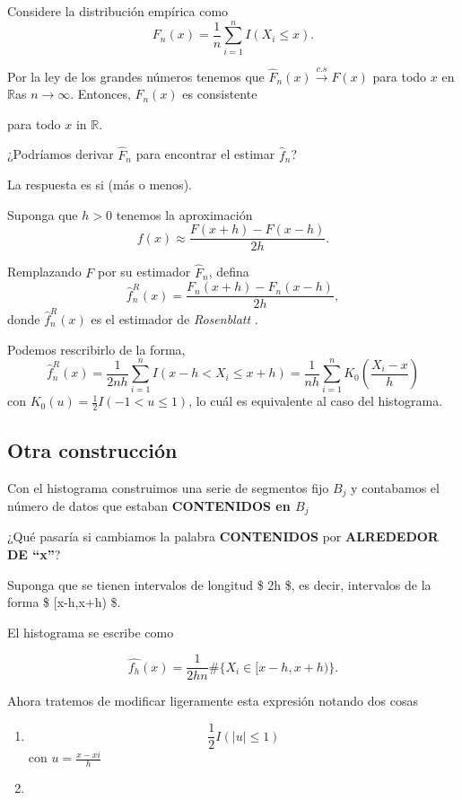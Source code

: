 \documentclass[
  12pt,
]{book}
\theoremstyle{definition}
\theoremstyle{definition}
\theoremstyle{definition}
\theoremstyle{remark}
\let\BeginKnitrBlock\begin \let\EndKnitrBlock\end
\begin{document}
Considere la distribución empírica como
\[
F_{n}(x)=\frac{1}{n}\sum_{i=1}^{n}I(X_{i}\leq x).
\]

Por la ley de los grandes números tenemos que \(\hat{F}_{n}(x) \xrightarrow{c.s} F(x)\) para todo \(x\) en \(\mathbb{R}\)as
\(n\rightarrow\infty\). Entonces, \(F_{n}(x)\) es consistente

para todo \(x\) in \(\mathbb{R}\).

\BeginKnitrBlock{remark}
{}¿Podríamos derivar \(\hat{F}_n\) para encontrar el estimar \(\hat{f}_n\)?
\EndKnitrBlock{remark}

La respuesta es si (más o menos).

Suponga que \(h>0\) tenemos la aproximación
\[
f(x)\approx\frac{F(x+h)-F(x-h)}{2h}.
\]

Remplazando \(F\) por su estimador \(\hat{F}_{n}\), defina
\[
\hat{f}_{n}^{R}(x)=\frac{F_{n}(x+h)-F_{n}(x-h)}{2h},
\]
donde \(\hat{f}_{n}^{R}(x)\) es el estimador de \emph{Rosenblatt }.

Podemos rescribirlo de la forma,
\[
\hat{f}_{n}^{R}(x)=\frac{1}{2nh}\sum_{i=1}^{n}I(x-h<X_{i}\leq x+h)=\frac{1}{nh}\sum_{i=1}^{n}K_{0}\left(\frac{X_{i}-x}{h}\right)
\]
con \(K_{0}(u)=\frac{1}{2}I(-1<u\leq1)\), lo cuál es equivalente al caso del histograma.

\hypertarget{otra-construcciuxf3n}{%
\subsection{Otra construcción}\label{otra-construcciuxf3n}}

Con el histograma construimos una serie de segmentos fijo \(B_{j}\) y contabamos el número de datos que estaban \textbf{CONTENIDOS en \(B_{j}\)}

\BeginKnitrBlock{remark}
{}¿Qué pasaría si cambiamos la palabra \textbf{CONTENIDOS} por \textbf{ALREDEDOR DE \enquote{x}}?
\EndKnitrBlock{remark}

Suponga que se tienen intervalos de longitud \$ 2h \$, es decir, intervalos de la forma \$ {[}x-h,x+h) \$.

El histograma se escribe como

\begin{equation*}
\hat{f_{h}}(x) = \dfrac{1}{2hn} \# \{ X_i \in [x-h,x+h) \}.
\end{equation*}

Ahora tratemos de modificar ligeramente esta expresión notando dos cosas

\begin{enumerate}
\def\labelenumi{\arabic{enumi}.}
\item
  \begin{equation*}
  \frac{1}{2} I \left( \left\vert u \right\vert \leq 1 \right)
  \end{equation*}
  con \(u = \frac{x-xi}{h}\)
\item
\end{enumerate}
\end{document}
